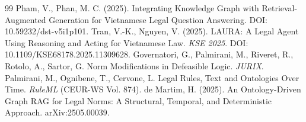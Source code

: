 {\begin{thebibliography}{99}
 Pham, V., Phan, M. C. (2025). Integrating Knowledge Graph with Retrieval-Augmented Generation for Vietnamese Legal Question Answering. DOI: 10.59232/dst-v5i1p101.
 Tran, V.-K., Nguyen, V. (2025). LAURA: A Legal Agent Using Reasoning and Acting for Vietnamese Law. \emph{KSE 2025}. DOI: 10.1109/KSE68178.2025.11309628.
 Governatori, G., Palmirani, M., Riveret, R., Rotolo, A., Sartor, G. Norm Modifications in Defeasible Logic. \emph{JURIX}.
 Palmirani, M., Ognibene, T., Cervone, L. Legal Rules, Text and Ontologies Over Time. \emph{RuleML} (CEUR-WS Vol. 874).
 de Martim, H. (2025). An Ontology-Driven Graph RAG for Legal Norms: A Structural, Temporal, and Deterministic Approach. arXiv:2505.00039.
\end{thebibliography}
}
